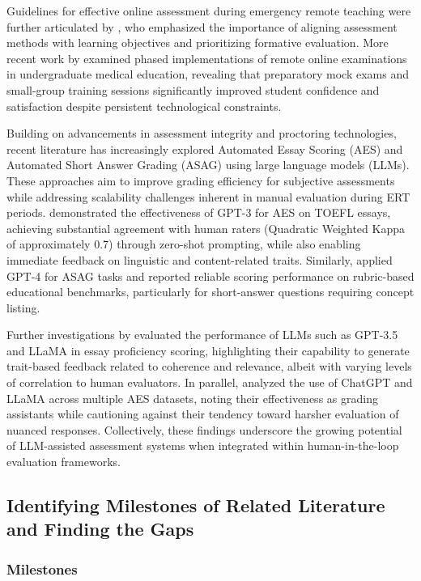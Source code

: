 Guidelines for effective online assessment during emergency remote teaching were further articulated by \citet{Rahim2020}, who emphasized the importance of aligning assessment methods with learning objectives and prioritizing formative evaluation. More recent work by \citet{Ali2025} examined phased implementations of remote online examinations in undergraduate medical education, revealing that preparatory mock exams and small-group training sessions significantly improved student confidence and satisfaction despite persistent technological constraints.

Building on advancements in assessment integrity and proctoring technologies, recent literature has increasingly explored Automated Essay Scoring (AES) and Automated Short Answer Grading (ASAG) using large language models (LLMs). These approaches aim to improve grading efficiency for subjective assessments while addressing scalability challenges inherent in manual evaluation during ERT periods. \citet{MizumotoEguchi2023} demonstrated the effectiveness of GPT-3 for AES on TOEFL essays, achieving substantial agreement with human raters (Quadratic Weighted Kappa of approximately 0.7) through zero-shot prompting, while also enabling immediate feedback on linguistic and content-related traits. Similarly, \citet{Schneider2024} applied GPT-4 for ASAG tasks and reported reliable scoring performance on rubric-based educational benchmarks, particularly for short-answer questions requiring concept listing.

Further investigations by \citet{Mansour2024} evaluated the performance of LLMs such as GPT-3.5 and LLaMA in essay proficiency scoring, highlighting their capability to generate trait-based feedback related to coherence and relevance, albeit with varying levels of correlation to human evaluators. In parallel, \citet{Kundu2024} analyzed the use of ChatGPT and LLaMA across multiple AES datasets, noting their effectiveness as grading assistants while cautioning against their tendency toward harsher evaluation of nuanced responses. Collectively, these findings underscore the growing potential of LLM-assisted assessment systems when integrated within human-in-the-loop evaluation frameworks.

\subsection{Identifying Milestones of Related Literature and Finding the Gaps}

\subsubsection{Milestones}

